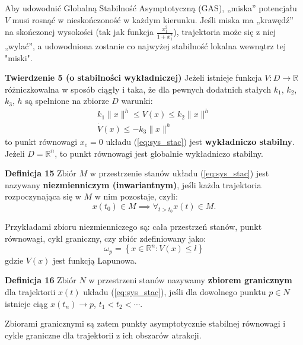 \documentclass{article}
\begin{document}
\begin{tcolorbox}[colback=blue!5, colframe=blue!75!black, title=Ważne]
Aby udowodnić Globalną Stabilność Asymptotyczną (GAS), „miska” potencjału $V$
musi rosnąć w nieskończoność w każdym kierunku. Jeśli miska ma „krawędź” na
skończonej wysokości (tak jak funkcja $\frac{x_1^2}{1 + x_1^2}$), trajektoria
może się z niej „wylać”, a udowodniona zostanie co najwyżej stabilność lokalna
wewnątrz tej "miski".
\end{tcolorbox}

\textbf{Twierdzenie 5 (o stabilności wykładniczej)}
Jeżeli istnieje funkcja $V:D\rightarrow\mathbb{R}$ różniczkowalna w sposób ciągły i taka, że dla pewnych dodatnich stałych $k_{1}$, $k_{2}$, $k_{3}$, $h$ są spełnione na zbiorze $D$ warunki:
\begin{equation}\label{eq:stab_wyk}
    \begin{array}{c}
         k_{1}\lVert x \rVert^{h} \leq V(x) \leq k_{2}\lVert x \rVert^{h}\\
         \dot{V}(x) \leq -k_{3}\lVert x \rVert^{h}
    \end{array}
\end{equation}
to punkt równowagi $x_{e} = 0$ układu (\ref{eq:sys_stac}) jest \textbf{wykładniczo stabilny}. Jeżeli $D = \mathbb{R}^{n}$, to punkt równowagi jest globalnie wykładniczo stabilny.

\textbf{Definicja 15}
Zbiór $M$ w przestrzenie stanów układu (\ref{eq:sys_stac}) jest nazywany \textbf{niezmienniczym (inwariantnym)}, jeśli każda trajektoria rozpoczynająca się w $M$ w nim pozostaje, czyli:
\begin{equation}\label{eq:zbior_inwariantny}
    x(t_{0}) \in M \implies \forall_{t > t_{0}}x(t) \in M.
\end{equation}

Przykładami zbioru niezmienniczego są: cała przestrzeń stanów, punkt równowagi, cykl graniczny, czy zbiór zdefiniowany jako:
$$
    \omega_{p} = \left\{ x \in \mathbb{R}^{n}:V(x) \leq l \right\}
$$
gdzie $V(x)$ jest funkcją Lapunowa.

\textbf{Definicja 16}
Zbiór $N$ w przestrzeni stanów nazywamy \textbf{zbiorem granicznym} dla trajektorii $x(t)$ układu (\ref{eq:sys_stac}), jeśli dla dowolnego punktu $p \in N$ istnieje ciąg $x(t_{n}) \rightarrow p$, $t_{1} < t_{2} < \cdots$.

Zbiorami granicznymi są zatem punkty asymptotycznie stabilnej równowagi i cykle graniczne dla trajektorii z ich obszarów atrakcji.
\end{document}
